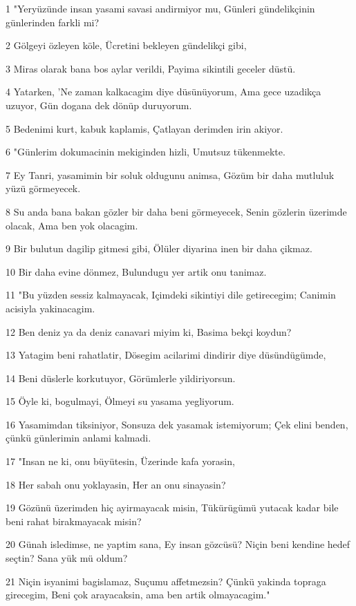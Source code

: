 \par 1 "Yeryüzünde insan yasami savasi andirmiyor mu, Günleri gündelikçinin günlerinden farkli mi?
\par 2 Gölgeyi özleyen köle, Ücretini bekleyen gündelikçi gibi,
\par 3 Miras olarak bana bos aylar verildi, Payima sikintili geceler düstü.
\par 4 Yatarken, 'Ne zaman kalkacagim diye düsünüyorum, Ama gece uzadikça uzuyor, Gün dogana dek dönüp duruyorum.
\par 5 Bedenimi kurt, kabuk kaplamis, Çatlayan derimden irin akiyor.
\par 6 "Günlerim dokumacinin mekiginden hizli, Umutsuz tükenmekte.
\par 7 Ey Tanri, yasamimin bir soluk oldugunu animsa, Gözüm bir daha mutluluk yüzü görmeyecek.
\par 8 Su anda bana bakan gözler bir daha beni görmeyecek, Senin gözlerin üzerimde olacak, Ama ben yok olacagim.
\par 9 Bir bulutun dagilip gitmesi gibi, Ölüler diyarina inen bir daha çikmaz.
\par 10 Bir daha evine dönmez, Bulundugu yer artik onu tanimaz.
\par 11 "Bu yüzden sessiz kalmayacak, Içimdeki sikintiyi dile getirecegim; Canimin acisiyla yakinacagim.
\par 12 Ben deniz ya da deniz canavari miyim ki, Basima bekçi koydun?
\par 13 Yatagim beni rahatlatir, Dösegim acilarimi dindirir diye düsündügümde,
\par 14 Beni düslerle korkutuyor, Görümlerle yildiriyorsun.
\par 15 Öyle ki, bogulmayi, Ölmeyi su yasama yegliyorum.
\par 16 Yasamimdan tiksiniyor, Sonsuza dek yasamak istemiyorum; Çek elini benden, çünkü günlerimin anlami kalmadi.
\par 17 "Insan ne ki, onu büyütesin, Üzerinde kafa yorasin,
\par 18 Her sabah onu yoklayasin, Her an onu sinayasin?
\par 19 Gözünü üzerimden hiç ayirmayacak misin, Tükürügümü yutacak kadar bile beni rahat birakmayacak misin?
\par 20 Günah isledimse, ne yaptim sana, Ey insan gözcüsü? Niçin beni kendine hedef seçtin? Sana yük mü oldum?
\par 21 Niçin isyanimi bagislamaz, Suçumu affetmezsin? Çünkü yakinda topraga girecegim, Beni çok arayacaksin, ama ben artik olmayacagim."

